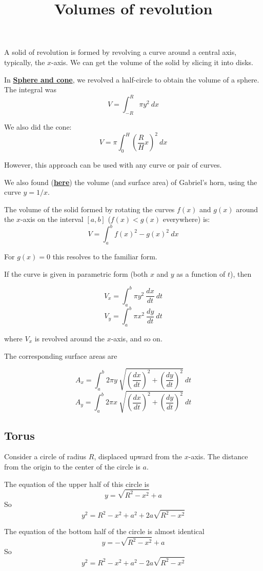 \documentclass[11pt, oneside]{article}
\title{Volumes of revolution}
\date{}
\begin{document}
\maketitle
\Large
\label{sec:Volumes_of_revolution}

A solid of revolution is formed by revolving a curve around a central axis, typically, the $x$-axis.  We can get the volume of the solid by slicing it into disks.

In \hyperref[sec:Sphere_and_cone]{\textbf{Sphere and cone}}, we revolved a half-circle to obtain the volume of a sphere.  The integral was
\[ V = \int_{-R}^{R} \pi y^2 \ dx \]

We also did the cone:
\[ V = \pi \int_0^H ( \frac{R}{H} x)^2 \ dx \]

However, this approach can be used with any curve or pair of curves.

We also found (\hyperref[sec:Improper_integrals]{\textbf{here}}) the volume (and surface area) of Gabriel's horn, using the curve $y = 1/x$.

The volume of the solid formed by rotating the curves $f(x)$ and $g(x)$ around the $x$-axis on the interval $[a,b]$ ($f(x) < g(x)$ everywhere) is:
\[ V = \int_a^b f(x)^2 - g(x)^2 \ dx \]

For $g(x) = 0$ this resolves to the familiar form.

If the curve is given in parametric form (both $x$ and $y$ as a function of $t$), then

\[ V_x = \int_a^b \pi y^2 \ \frac{dx}{dt} \ dt \]
\[ V_y = \int_a^b \pi x^2 \ \frac{dy}{dt} \ dt \]

where $V_x$ is revolved around the $x$-axis, and so on.

The corresponding surface areas are

\[ A_x = \int_a^b 2 \pi y \ \sqrt{(\frac{dx}{dt})^2 + (\frac{dy}{dt})^2} \ dt \]
\[ A_y = \int_a^b 2 \pi x \ \sqrt{(\frac{dx}{dt})^2 + (\frac{dy}{dt})^2} \ dt \]

\subsection*{Torus}
Consider a circle of radius $R$, displaced upward from the $x$-axis.  The distance from the origin to the center of the circle is $a$.

The equation of the upper half of this circle is
\[ y = \sqrt{R^2 - x^2} + a  \]
So
\[ y^2 = R^2 - x^2 + a^2 + 2 a \sqrt{R^2 - x^2} \]

The equation of the bottom half of the circle is almost identical
\[ y  = -\sqrt{R^2 - x^2} + a  \]
So
\[ y^2 = R^2 - x^2 + a^2 - 2 a \sqrt{R^2 - x^2} \]
\end{document}
